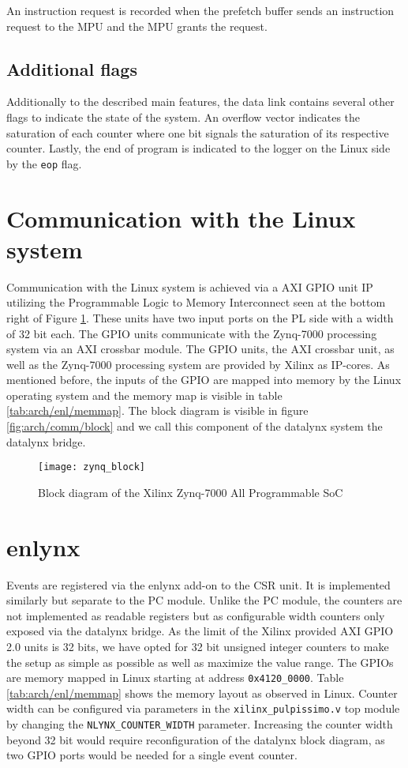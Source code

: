 \documentclass[../bachelor_paper.tex]{subfiles}
\begin{document}
An instruction request is recorded when the prefetch buffer sends an instruction request to the \ac{MPU} and the \ac{MPU} grants the request.

\subsection{Additional flags}
Additionally to the described main features, the data link contains several other flags to indicate the state of the system. An overflow vector indicates the saturation of each counter where one bit signals the saturation of its respective counter. Lastly, the end of program is indicated to the logger on the Linux side by the \texttt{eop} flag.

\section{Communication with the Linux system}
Communication with the Linux system is achieved via a AXI GPIO unit \ac{IP} utilizing the Programmable Logic to Memory Interconnect seen at the bottom right of Figure \ref{fig:arch/comm/zynq}. These units have two input ports on the \ac{PL} side with a width of 32 bit each. The GPIO units communicate with the Zynq-7000 processing system via an AXI crossbar module. The GPIO units, the AXI crossbar unit, as well as the Zynq-7000 processing system are provided by Xilinx as \ac{IP}-cores. As mentioned before, the inputs of the GPIO are mapped into memory by the Linux operating system and the memory map is visible in table \ref{tab:arch/enl/memmap}. The block diagram is visible in figure \ref{fig:arch/comm/block} and we call this component of the datalynx system the datalynx bridge.

\begin{figure}
    \centering
    \texttt{[image: zynq\_block]}
    \caption{Block diagram of the Xilinx\textsuperscript{\textregistered} Zynq\textsuperscript{\textregistered}-7000 All Programmable \ac{SoC}}
    \label{fig:arch/comm/zynq}
\end{figure}

\section{enlynx}
    \label{sec:arch/enlynx}
Events are registered via the enlynx add-on to the \ac{CSR} unit. It is implemented similarly but separate to the \ac{PC} module. Unlike the \ac{PC} module, the counters are not implemented as readable registers but as configurable width counters only exposed via the datalynx bridge. As the limit of the Xilinx provided AXI GPIO 2.0 units is 32 bits, we have opted for 32 bit unsigned integer counters to make the setup as simple as possible as well as maximize the value range. The GPIOs are memory mapped in Linux starting at address \texttt{0x4120\_0000}. Table \ref{tab:arch/enl/memmap} shows the memory layout as observed in Linux. Counter width can be configured via parameters in the \texttt{xilinx\_pulpissimo.v} top module by changing the \texttt{NLYNX\_COUNTER\_WIDTH} parameter. Increasing the counter width beyond 32 bit would require reconfiguration of the datalynx block diagram, as two GPIO ports would be needed for a single event counter.
\end{document}

